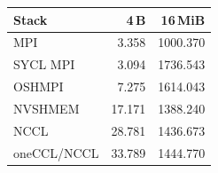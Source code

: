 \begin{tabular}{lrr}
\toprule
Stack & 4\,B & 16\,MiB\\
\midrule
MPI & 3.358 & 1000.370\\
SYCL MPI & 3.094 & 1736.543\\
OSHMPI & 7.275 & 1614.043\\
NVSHMEM & 17.171 & 1388.240\\
NCCL & 28.781 & 1436.673\\
oneCCL/NCCL & 33.789 & 1444.770\\
\bottomrule
\end{tabular}
